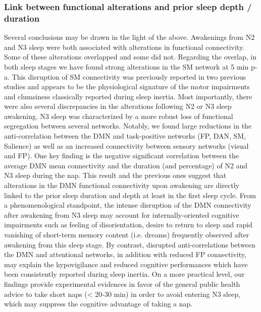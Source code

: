 \subsubsection*{Link between functional alterations and prior sleep depth / duration}
Several conclusions may be drawn in the light of the above. Awakenings from N2 and N3 sleep were both associated with alterations in functional connectivity. Some of these alterations overlapped and some did not. Regarding the overlap, in both sleep stages we have found strong alterations in the SM network at 5 min p-a. This disruption of SM connectivity was previously reported in two previous studies \citep{wu_variations_2012, tsai_local_2014} and appears to be the physiological signature of the motor impairments and clumsiness classically reported during sleep inertia. Most importantly, there were also several discrepancies in the alterations following N2 or N3 sleep awakening. N3 sleep was characterized by a more robust loss of functional segregation between several networks. Notably, we found large reductions in the anti-correlation between the DMN and task-positive networks (FP, DAN, SM, Salience) as well as an increased connectivity between sensory networks (visual and FP). One key finding is the negative significant correlation between the average DMN mean connectivity and the duration (and percentage) of N2 and N3 sleep during the nap. This result and the previous ones suggest that alterations in the DMN functional connectivity upon awakening are directly linked to the prior sleep duration and depth at least in the first sleep cycle. From a phenomenological standpoint, the intense disruption of the DMN connectivity after awakening from N3 sleep may account for internally-oriented cognitive impairments such as feeling of disorientation, desire to return to sleep and rapid vanishing of short-term memory content (i.e. dreams) frequently observed after awakening from this sleep stage. By contrast, disrupted anti-correlations between the DMN and attentional networks, in addition with reduced FP connectivity, may explain the hypovigilance and reduced cognitive performances which have been consistently reported during sleep inertia. On a more practical level, our findings provide experimental evidences in favor of the general public health advice to take short naps (< 20-30 min) in order to avoid entering N3 sleep, which may suppress the cognitive advantage of taking a nap.

